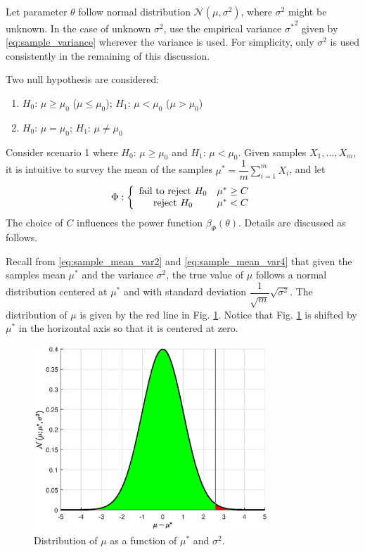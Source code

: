 Let parameter $\theta$ follow normal distribution $\mathcal{N}(\mu,\sigma^2)$, where $\sigma^2$ might be unknown. In the case of unknown $\sigma^2$, use the empirical variance ${\sigma^*}^2$ given by \eqref{eq:sample_variance} wherever the variance is used. For simplicity, only $\sigma^2$ is used consistently in the remaining of this discussion.

Two null hypothesis are considered:
\begin{enumerate}
	\item $H_0$: $\mu \geq \mu_0$ ($\mu \leq \mu_0$); $H_1$: $\mu < \mu_0$ ($\mu > \mu_0$)
	\item $H_0$: $\mu = \mu_0$; $H_1$: $\mu \neq \mu_0$
\end{enumerate}

Consider scenario 1 where $H_0$: $\mu \geq \mu_0$ and  $H_1$: $\mu < \mu_0$. Given samples $X_1,\ldots,X_m$, it is intuitive to survey the mean of the samples $\mu^*=\dfrac{1}{m}\sum_{i=1}^{m}X_i$, and let
\begin{eqnarray}
	\Phi : \left\{\begin{array}{cc}
		\textup{fail to reject~} H_0 & \mu^* \geq C \\
		\textup{reject~} H_0 & \mu^* < C
	\end{array}\right. \label{eq:hypotest_normal_1}
\end{eqnarray}
The choice of $C$ influences the power function $\beta_{\Phi}(\theta)$. Details are discussed as follows.

Recall from \eqref{eq:sample_mean_var2} and \eqref{eq:sample_mean_var4} that given the samples mean $\mu^*$ and the variance $\sigma^2$, the true value of $\mu$ follows a normal distribution centered at $\mu^*$ and with standard deviation $\dfrac{1}{\sqrt{m}}\sqrt{\sigma^2}$. The distribution of $\mu$ is given by the red line in Fig. \ref{ch:hypothesis_normal_mean}. Notice that Fig. \ref{ch:hypothesis_normal_mean} is shifted by $\mu^*$ in the horizontal axis so that it is centered at zero.
\begin{figure}
	\centering
	\includegraphics[width=250pt]{chapters/ch-hypothesis-testing/figures/hypothesis_normal_mean.eps}
	\caption{Distribution of $\mu$ as a function of $\mu^*$ and $\sigma^2$.} \label{ch:hypothesis_normal_mean}
\end{figure}

